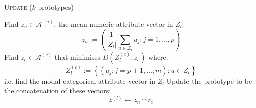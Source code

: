 \balg%
    \caption{\textsc{Update} (\(k\)-prototypes)}\label{alg:update}

    Find \(z_n \in \mathcal A^{(n)}\), the mean numeric attribute vector in
    \(Z_l\):
    \[
        z_n := \left(%
            \frac{1}{\lvert Z_l \rvert} \sum_{u \in Z_l} u_j :
            j = 1, \ldots, p
        \right)%
    \]\;
    Find \(z_c \in \mathcal A^{(c)}\) that minimises
    \(D\left(Z_l^{(c)},z_c\right)\) where:
    \[
        Z_l^{(c)} := \left\{%
            (u_j: j = p+1, \ldots, m) : u \in Z_l 
        \right\}%
    \]
    i.e. find the modal categorical attribute vector in \(Z_l\)\;
    Update the prototype to be the concatenation of these vectors:
    \[
        z^{(l)} \gets z_n \frown z_c%
    \]
\ealg%
